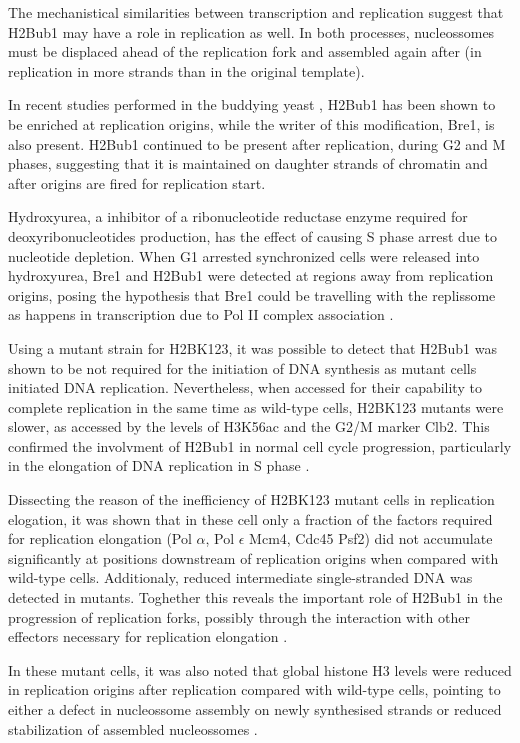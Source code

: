 \documentclass[11pt,twoside,a4paper]{report}
\begin{document}
		The mechanistical similarities between transcription and replication suggest that H2Bub1 may have a role in replication as well. In both processes, nucleossomes must be displaced ahead of the replication fork and assembled again after (in replication in more strands than in the original template).
		
		In recent studies performed in the buddying yeast  \cite{Trujillo2012}, H2Bub1 has been shown to be enriched at replication origins, while the writer of this modification, Bre1, is also present. H2Bub1 continued to be present after replication, during G2 and M phases, suggesting that it is maintained on daughter strands of chromatin and after origins are fired for replication start.
		
		Hydroxyurea, a inhibitor of a ribonucleotide reductase enzyme required for deoxyribonucleotides production, has the effect of causing S phase arrest due to nucleotide depletion. When G1 arrested synchronized cells were released into hydroxyurea, Bre1 and H2Bub1 were detected at regions away from replication origins, posing the hypothesis that Bre1 could be travelling with the replissome as happens in transcription due to Pol II complex association \cite{Trujillo2012}.
		
		Using a mutant strain for H2BK123, it was possible to detect that H2Bub1 was shown to be not required for the initiation of DNA synthesis as mutant cells initiated DNA replication. Nevertheless, when accessed for their capability to complete replication in the same time as wild-type cells, H2BK123 mutants were slower, as accessed by the levels of H3K56ac and the G2/M marker Clb2. This confirmed the involvment of H2Bub1 in normal cell cycle progression, particularly in the elongation of DNA replication in S phase \cite{Trujillo2012}.
		
		Dissecting the reason of the inefficiency of H2BK123 mutant cells in replication elogation, it was shown that in these cell only a fraction of the factors required for replication elongation (Pol $\alpha$, Pol $\epsilon$ Mcm4, Cdc45 Psf2) did not accumulate significantly at positions downstream of replication origins when compared with wild-type cells. Additionaly, reduced intermediate single-stranded DNA was detected in mutants. Toghether this reveals the important role of H2Bub1 in the progression of replication forks, possibly through the interaction with other effectors necessary for replication elongation \cite{Trujillo2012}.
		
		In these mutant cells, it was also noted that global histone H3 levels were reduced in replication origins after replication compared with wild-type cells, pointing to either a defect in nucleossome assembly on newly synthesised strands or reduced stabilization of assembled nucleossomes \cite{Trujillo2012}.
		
\end{document}
